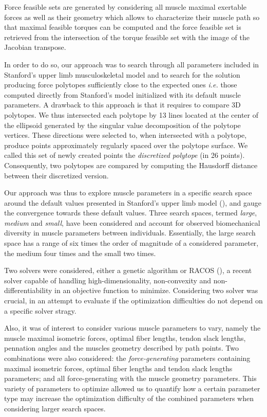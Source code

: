 Force feasible sets are generated by considering all muscle maximal exertable forces as well as their geometry which allows to characterize their muscle path so that maximal feasible torques can be computed and the force feasible set is retrieved from the intersection of the torque feasible set with the image of the Jacobian transpose. 

In order to do so, our approach was to search through all parameters included in Stanford's upper limb musculoskeletal model and to search for the solution producing force polytopes sufficiently close to the expected ones \emph{i.e.} those computed directly from Stanford's model initialized with its default muscle parameters. A drawback to this approach is that it requires to compare 3D polytopes. We thus intersected each polytope by 13 lines located at the center of the ellipsoid generated by the singular value decomposition of the polytope vertices. These directions were selected to, when intersected with a polytope, produce points approximately regularly spaced over the polytope surface. We called this set of newly created points the \emph{discretized polytope} (in 26 points).
Consequently, two polytopes are compared by computing the Hausdorff distance between their discretized version.

Our approach was thus to explore muscle parameters in a specific search space around the default values presented in Stanford's upper limb model (\cite{holzbaurModelUpperExtremity2005}), and gauge the convergence towards these default values. Three search spaces, termed \emph{large}, \emph{medium} and \emph{small}, have been considered and account for observed biomechanical diversity in muscle parameters between individuals. Essentially, the large search space has a range of six times the order of magnitude of a considered parameter, the medium four times and the small two times.

Two solvers were considered, either a genetic algorithm or RACOS (\cite{yuDerivativeFreeOptimizationClassification2016}), a recent solver capable of handling high-dimensionality, non-convexity and non-differentiability in an objective function to minimize. Considering two solver was crucial, in an attempt to evaluate if the optimization difficulties do not depend on a specific solver stragy.

Also, it was of interest to consider various muscle parameters to vary, namely the muscle maximal isometric forces, optimal fiber lengths, tendon slack lengths, pennation angles and the muscles geometry described by path points. Two combinations were also considered: the \emph{force-generating} parameters containing maximal isometric forces, optimal fiber lengths and tendon slack lengths parameters; and all force-generating with the muscle geometry parameters. This variety of parameters to optimize allowed us to quantify how a certain parameter type may increase the optimization difficulty of the combined parameters when considering larger search spaces.

